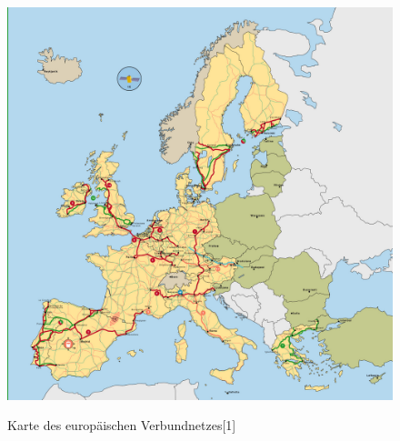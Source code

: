 \begin{figure}[t]
	\centering
	{\includegraphics[scale=0.9]{bilder/europastromnetz}\label{fig_europastromnetz}
	}\\
	\caption[Karte des europäischen Verbundnetzes]{Karte des europäischen Verbundnetzes[1]}
	\label{fig_europastromnetz}
\end{figure}

